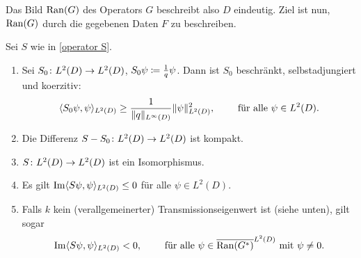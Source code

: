 Das Bild \(\operatorname{Ran}(G)\) des Operators \(G\) beschreibt also \(D\) eindeutig. Ziel ist nun, \(\operatorname{Ran}(G)\) durch die gegebenen Daten \(F\) zu beschreiben.
\begin{satz}\label{satz: eigenschaften von S}
	Sei \(S\) wie in \eqref{operator S}.
	\begin{enumerate}[label=(\alph*)]
		\item\label{satz: eigenschaften von S a} Sei \(S_0\colon L^2(D) \to L^2(D)\), \(S_0\psi\coloneqq\frac{1}{q}\psi\). Dann ist \(S_0\) beschränkt, selbstadjungiert und koerzitiv:
		\begin{equation*}
			\langle S_0\psi,\psi\rangle_{L^2(D)}\geq\frac{1}{\|q\|_{L^\infty(D)}} \|\psi\|_{L^2(D)}^2,\qquad\text{ für alle }\psi\in L^2(D).
		\end{equation*}
		\item\label{satz: eigenschaften von S b} Die Differenz \(S-S_0\colon L^2(D) \to L^2(D)\) ist kompakt.
		\item\label{satz: eigenschaften von S c} \(S\colon L^2(D) \to L^2(D)\) ist ein Isomorphismus.
		\item\label{satz: eigenschaften von S d} Es gilt \(\operatorname{Im}\langle S\psi,\psi\rangle_{L^2(D)}\leq0\) für alle \(\psi\in L^2(D)\).
		\item\label{satz: eigenschaften von S e} Falls \(k\) kein (verallgemeinerter) Transmissionseigenwert ist (siehe unten), gilt sogar
		\begin{equation*}
			\operatorname{Im}\langle S\psi,\psi\rangle_{L^2(D)}<0,\qquad\text{ für alle }\psi\in\overline{\operatorname{Ran}(G^\ast)}^{L^2(D)}\text{ mit }\psi\neq0.
		\end{equation*}
	\end{enumerate}
\end{satz}

